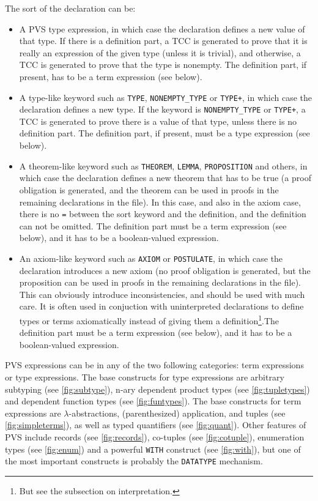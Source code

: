 \documentclass[utf8,a4paper]{article}
\begin{document}
The sort of the declaration can be:
\begin{itemize}
\item A PVS type expression, in which case the declaration defines a
  new value of that type. If there is a definition part, a TCC is
  generated to prove that it is really an expression of the given type
  (unless it is trivial), and otherwise, a TCC is generated to prove
  that the type is nonempty. The definition part, if present, has to
  be a term expression (see below).
\item A type-like keyword such as \verb!TYPE!, \verb!NONEMPTY_TYPE! or
  \verb!TYPE+!, in which case the declaration defines a new type. If
  the keyword is \verb!NONEMPTY_TYPE! or \verb!TYPE+!, a TCC is
  generated to prove there is a value of that type, unless there is no
  definition part. The definition part, if present, must be a type
  expression (see below).
\item A theorem-like keyword such as \verb!THEOREM!, \verb!LEMMA!,
  \verb!PROPOSITION! and others, in which case the declaration defines
  a new theorem that has to be true (a proof obligation is generated,
  and the theorem can be used in proofs in the remaining declarations
  in the file). In this case, and also in the axiom case, there is no
  \verb!=! between the sort keyword and the definition, and the
  definition can not be omitted. The definition part must be a term
  expression (see below), and it has to be a boolean-valued
  expression.
\item An axiom-like keyword such as \verb!AXIOM! or \verb!POSTULATE!,
  in which case the declaration introduces a new axiom (no proof
  obligation is generated, but the proposition can be used in proofs
  in the remaining declarations in the file). This can obviously
  introduce inconsistencies, and should be used with much care. It is
  often used in conjuction with uninterpreted declarations to define
  types or terms axiomatically instead of giving them a
  definition\footnote{But see the subsection on interpretation.}.The
  definition part must be a term expression (see below), and it has to
  be a boolean-valued expression.
\end{itemize}

PVS expressions can be in any of the two following categories: term
expressions or type expressions. The base constructs for type
expressions are arbitrary subtyping (see \cref{fig:subtype}), n-ary
dependent product types (see \cref{fig:tupletypes}) and dependent
function types (see \cref{fig:funtypes}). The base constructs for
term expressions are $\lambda$-abstractions, (parenthesized)
application, and tuples (see \cref{fig:simpleterms}), as well as
typed quantifiers (see \cref{fig:quant}). Other features of PVS
include records (see \cref{fig:records}), co-tuples (see
\cref{fig:cotuple}), enumeration types (see \cref{fig:enum}) and
a powerful \verb!WITH! construct (see \cref{fig:with}), but one of
the most important constructs is probably the \verb!DATATYPE!
mechanism.
\end{document}
